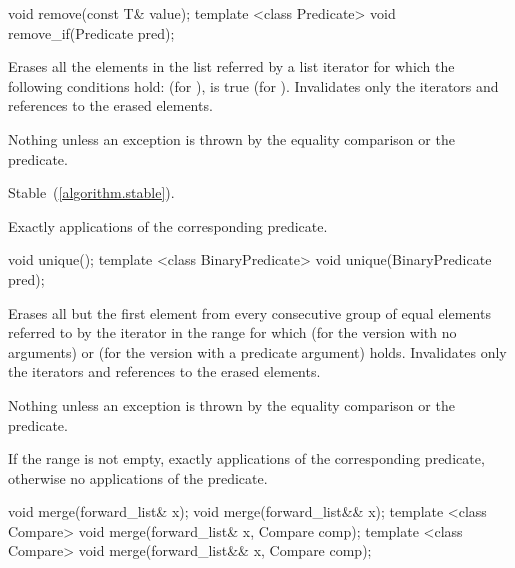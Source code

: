 %
%
%
%
\begin{itemdecl}
void remove(const T& value);
template <class Predicate> void remove_if(Predicate pred);
\end{itemdecl}

\begin{itemdescr}
\pnum
\effects Erases all the elements in the list referred by a list iterator  for
which the following conditions hold:  (for ),
 is true (for ).
Invalidates only the iterators and references to the erased elements.

\pnum
\throws Nothing unless an exception is thrown by the equality comparison or the
predicate.

\pnum
\remarks Stable~(\ref{algorithm.stable}).

\pnum
\complexity Exactly  applications of the corresponding
predicate.
\end{itemdescr}

%
%
\begin{itemdecl}
void unique();
template <class BinaryPredicate> void unique(BinaryPredicate pred);
\end{itemdecl}

\begin{itemdescr}
\pnum
\effects Erases all but the first element from every consecutive
group of equal elements referred to by the iterator  in the range  for which  (for the version with no arguments) or  (for the version with a predicate argument) holds.
Invalidates only the iterators and references to the erased elements.

\pnum
\throws Nothing unless an exception is thrown by the equality comparison or the predicate.

\pnum
\complexity If the range  is not empty, exactly  applications of the corresponding predicate, otherwise no applications of the predicate.
\end{itemdescr}

%
%
\begin{itemdecl}
void merge(forward_list& x);
void merge(forward_list&& x);
template <class Compare> void merge(forward_list& x, Compare comp);
template <class Compare> void merge(forward_list&& x, Compare comp);
\end{itemdecl}

